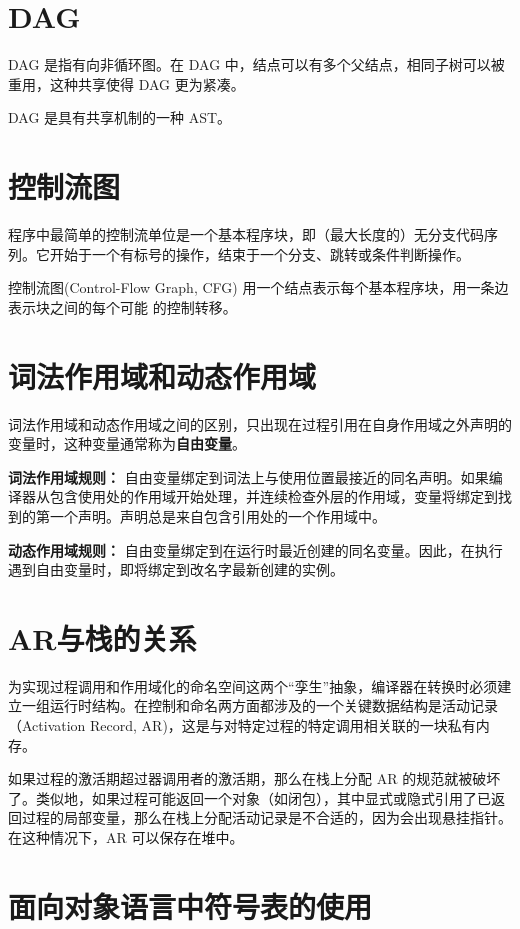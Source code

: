 \documentclass[12pt]{article}
\begin{document}
\section*{DAG}

DAG 是指有向非循环图。在 DAG 中，结点可以有多个父结点，相同子树可以被重用，这种共享使得 DAG 更为紧凑。

DAG 是具有共享机制的一种 AST。

\section*{控制流图}

程序中最简单的控制流单位是一个基本程序块，即（最大长度的）无分支代码序列。它开始于一个有标号的操作，结束于一个分支、跳转或条件判断操作。

控制流图(Control-Flow Graph, CFG) 用一个结点表示每个基本程序块，用一条边表示块之间的每个可能 的控制转移。

\section*{词法作用域和动态作用域}

词法作用域和动态作用域之间的区别，只出现在过程引用在自身作用域之外声明的变量时，这种变量通常称为\textbf{自由变量}。

\textbf{词法作用域规则：} 自由变量绑定到词法上与使用位置最接近的同名声明。如果编译器从包含使用处的作用域开始处理，并连续检查外层的作用域，变量将绑定到找到的第一个声明。声明总是来自包含引用处的一个作用域中。

\textbf{动态作用域规则：} 自由变量绑定到在运行时最近创建的同名变量。因此，在执行遇到自由变量时，即将绑定到改名字最新创建的实例。

\section*{AR与栈的关系}

为实现过程调用和作用域化的命名空间这两个“孪生”抽象，编译器在转换时必须建立一组运行时结构。在控制和命名两方面都涉及的一个关键数据结构是活动记录（Activation Record, AR)，这是与对特定过程的特定调用相关联的一块私有内存。

如果过程的激活期超过器调用者的激活期，那么在栈上分配 AR 的规范就被破坏了。类似地，如果过程可能返回一个对象（如闭包），其中显式或隐式引用了已返回过程的局部变量，那么在栈上分配活动记录是不合适的，因为会出现悬挂指针。在这种情况下，AR 可以保存在堆中。

\section*{面向对象语言中符号表的使用}
\end{document}
